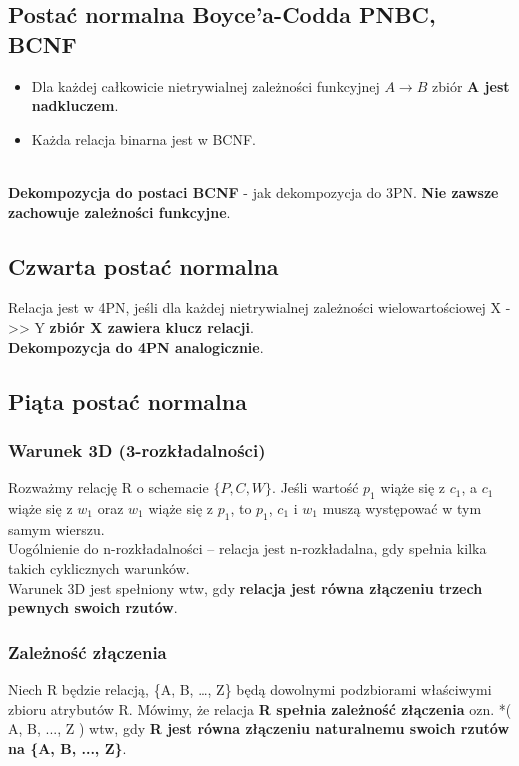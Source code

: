 \documentclass[a4paper]{article}
\begin{document}
\subsection{Postać normalna Boyce'a-Codda PNBC, BCNF}
\begin{itemize}
    \item Dla każdej całkowicie nietrywialnej zależności funkcyjnej $A \rightarrow B$ zbiór \textbf{A jest nadkluczem}.
    \item Każda relacja binarna jest w BCNF.
\end{itemize}
\hfill \\
\textbf{Dekompozycja do postaci BCNF} - jak dekompozycja do 3PN. \textbf{Nie zawsze zachowuje zależności funkcyjne}.

\subsection{Czwarta postać normalna}
Relacja jest w 4PN, jeśli dla każdej nietrywialnej zależności
wielowartościowej X ->> Y \textbf{zbiór X zawiera klucz relacji}.\\
\textbf{Dekompozycja do 4PN analogicznie}.

\subsection{Piąta postać normalna}

\subsubsection{Warunek 3D (3-rozkładalności)}
Rozważmy relację R o schemacie $\{P, C, W\}$. Jeśli wartość $p_1$ wiąże się z $c_1$, a $c_1$ wiąże się z $w_1$ oraz $w_1$ wiąże się z $p_1$, to $p_1$, $c_1$ i $w_1$ muszą występować w tym samym wierszu.\\
Uogólnienie do n-rozkładalności – relacja jest n-rozkładalna, gdy spełnia kilka takich cyklicznych warunków.\\

Warunek 3D jest spełniony wtw, gdy \textbf{relacja jest równa złączeniu trzech pewnych swoich rzutów}.

\subsubsection{Zależność złączenia}
Niech R będzie relacją, \{A, B, \dots, Z\} będą dowolnymi podzbiorami właściwymi zbioru atrybutów R. Mówimy, że relacja \textbf{R spełnia zależność złączenia} ozn. *( A, B, ..., Z ) wtw, gdy \textbf{R jest równa złączeniu naturalnemu swoich rzutów na \{A, B, ..., Z\}}.\\
\end{document}
